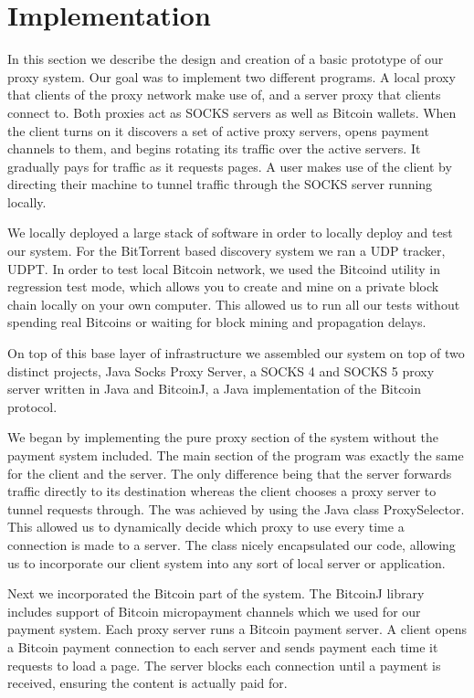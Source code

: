 \section{Implementation}
\label{sec:eval}

In this section we describe the design and creation of a basic prototype of our proxy system. Our goal was to implement two different programs. A local proxy that clients of the proxy network make use of, and a server proxy that clients connect to. Both proxies act as SOCKS servers as well as Bitcoin wallets. When the client turns on it discovers a set of active proxy servers, opens payment channels to them, and begins rotating its traffic over the active servers. It gradually pays for traffic as it requests pages. A user makes use of the client by directing their machine to tunnel traffic through the SOCKS server running locally.

We locally deployed a large stack of software in order to locally deploy and test our system. For the BitTorrent based discovery system we ran a UDP tracker, UDPT. In order to test local Bitcoin network, we used the Bitcoind utility in regression test mode, which allows you to create and mine on a private block chain locally on your own computer. This allowed us to run all our tests without spending real Bitcoins or waiting for block mining and propagation delays. 

On top of this base layer of infrastructure we assembled our system on top of two distinct projects, Java Socks Proxy Server, a SOCKS 4 and SOCKS 5 proxy server written in Java and BitcoinJ, a Java implementation of the Bitcoin protocol.

We began by implementing the pure proxy section of the system without the payment system included. The main section of the program was exactly the same for the client and the server. The only difference being that the server forwards traffic directly to its destination whereas the client chooses a proxy server to tunnel requests through. The was achieved by using the Java class ProxySelector. This allowed us to dynamically decide which proxy to use every time a connection is made to a server. The class nicely encapsulated our code, allowing us to incorporate our client system into any sort of local server or application.

Next we incorporated the Bitcoin part of the system. The BitcoinJ library includes support of Bitcoin micropayment channels which we used for our payment system. Each proxy server runs a Bitcoin payment server. A client opens a Bitcoin payment connection to each server and sends payment each time it requests to load a page. The server blocks each connection until a payment is received, ensuring the content is actually paid for.

